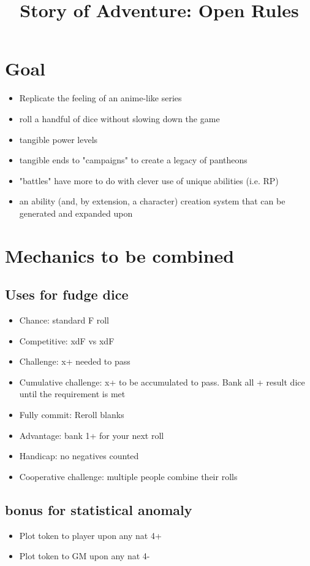 \documentclass[10pt,letterpaper]{article}
\title{Story of Adventure: Open Rules}
\begin{document}
	
\section{Goal}
\begin{itemize}
  \item  Replicate the feeling of an anime-like series 
  \item  roll a handful of dice without slowing down the game 
  \item  tangible power levels 
  \item  tangible ends to "campaigns" to create a legacy of pantheons
  \item  "battles" have more to do with clever use of unique abilities (i.e. RP)
  \item  an ability (and, by extension, a character) creation system that can be generated and expanded upon
\end{itemize}


\section{Mechanics to be combined}

\subsection{Uses for fudge dice}
\begin{itemize}
  \item  Chance: standard F roll
  \item  Competitive: xdF vs xdF
  \item  Challenge: x+ needed to pass
  \item  Cumulative challenge: x+ to be accumulated to pass. Bank all + result dice until the requirement is met
  \item  Fully commit: Reroll blanks
  \item  Advantage: bank 1+ for your next roll
  \item  Handicap: no negatives counted
  \item  Cooperative challenge: multiple people combine their rolls 
\end{itemize}
\subsection{bonus for statistical anomaly}
\begin{itemize}
  \item  Plot token to player upon any nat 4+
  \item  Plot token to GM upon any nat 4-
\end{itemize}
\end{document}
